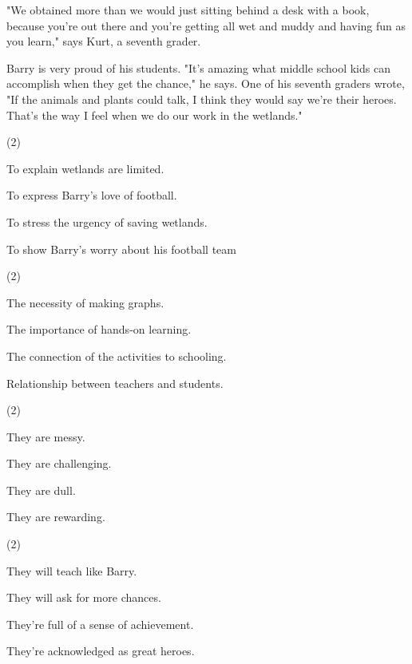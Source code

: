 \documentclass{英语试卷}
\begin{document}
\par "We obtained more than we would just sitting behind a desk with a book, because you're out there and you're getting all wet and muddy and having fun as you learn," says Kurt, a seventh grader.\par
\par Barry is very proud of his students. "It's amazing what middle school kids can accomplish when they get the chance," he says. One of his seventh graders wrote, "If the animals and plants could talk, I think they would say we're their heroes. That's the way I feel when we do our work in the wetlands."\par
{}
\begin{choices}(2)
  \item To explain wetlands are limited.
  \item To express Barry's love of football.
  \item To stress the urgency of saving wetlands.
  \item To show Barry's worry about his football team
\end{choices}
\begin{choices}(2)
  \item The necessity of making graphs.
  \item The importance of hands-on learning.
  \item The connection of the activities to schooling.
  \item Relationship between teachers and students.
\end{choices}
\begin{choices}(2)
  \item They are messy.
  \item They are challenging.
  \item They are dull.
  \item They are rewarding.
\end{choices}
\begin{choices}(2)
  \item They will teach like Barry.
  \item They will ask for more chances.
  \item They're full of a sense of achievement.
  \item They're acknowledged as great heroes.
\end{choices}
\end{document}
